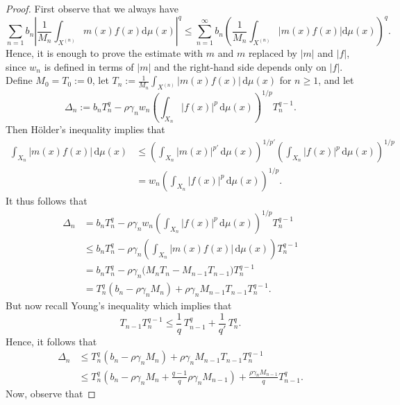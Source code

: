 \documentclass[oneside,10pt]{article}          %
\numberwithin{equation}{section}
\begin{document}
\begin{proof}
    First observe that we always have
    \[
    \sum_{n = 1} b_n \left| \frac{1}{M_n} \int_{X^{(n)}} m (x) f (x) \mathrm{d}\mu (x) \right|^q \leq \sum_{n = 1}^\infty b_n \!\left( \frac{1}{M_n} \int_{X^{(n)}} |m (x) f(x)|  \mathrm{d}\mu (x) \right)^{\!q}.
    \]
    Hence, it is enough to prove the estimate with $m$ and $m$ replaced by $|m|$ and $|f|$, since $w_n$ is defined in terms of $|m|$ and the right-hand side depends only on $|f|$.
    Define $M_0=T_0:=0$, let $T_n := \frac{1}{M_n} \int_{X^{(n)}} |m(x) f (x)| \,\mathrm{d}\mu (x)$ for $n\geq 1$, and let
    \[
    \Delta_n := b_n T_n^q - \rho\gamma_n w_n\left(\int_{X_n} |f(x)|^p \,\mathrm{d}\mu(x)\right)^{\!\!1/p} T_n^{q-1}.
    \]
    Then Hölder's inequality implies that
    \begin{align*}
        \int_{X_n} |m(x) f(x)| \,\mathrm{d}\mu(x)
        &\leq \left(\int_{X_n} |m(x)|^{p'} \,\mathrm{d}\mu(x) \right)^{\!\!1/p'}\!
        \left(\int_{X_n} |f(x)|^p \,\mathrm{d}\mu(x) \right)^{\!\!1/p} \\
        &= w_n \left(\int_{X_n} |f(x)|^p \,\mathrm{d}\mu(x) \right)^{\!\!1/p}.
    \end{align*}
    It thus follows that
    \begin{align*}
        \Delta_n &= b_n T_n^q - \rho\gamma_nw_n\left(\int_{X_n} |f(x)|^p \,\mathrm{d}\mu(x)\right)^{\!\!1/p} T_n^{q-1} \\
        &\leq  b_n T_n^q - \rho\gamma_n \left( \int_{X_n} |m(x) f(x)| \,\mathrm{d}\mu(x) \right) T_n^{q-1} \\
        &= b_n T_n^q - \rho\gamma_n \big(M_nT_n-M_{n-1} T_{n-1}\big) T_n^{q-1} \\
        &= T_n^q \left( b_n - \rho\gamma_n M_n \right)
        + \rho\gamma_n M_{n-1} T_{n-1} T_{n}^{q-1}.
    \end{align*}
    But now recall Young's inequality which implies that
    \[
    T_{n-1} T_{n}^{q-1} \leq \frac{1}{q}\, T_{n-1}^q +  \frac{1}{q'}\, T_n^q.
    \]
    Hence, it follows that
    \begin{align*}
        \Delta_n &\leq  T_n^q \left( b_n - \rho\gamma_n M_n \right)
        + \rho\gamma_n M_{n-1} T_{n-1} T_{n}^{q-1} \\
        &\leq T_n^q \left( b_n - \rho\gamma_n M_n
        + \frac{q-1}{q}\rho\gamma_n M_{n-1} \right)
        + \frac{\rho\gamma_n M_{n-1}}{q} T_{n-1}^q.
    \end{align*}
    Now, observe that

\end{proof}
\end{document}

